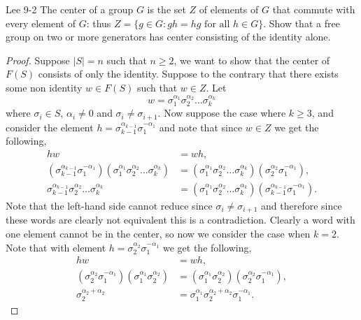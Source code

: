 \documentclass{homework651}
\begin{document}
\begin{problems}

    \problem Lee 9-2 
    The center of a group $G$ is the set $Z$ of elements of $G$ that commute with every element of $G$: thus $Z = \{g \in G: gh = hg \text{ for all } h \in G\}$. Show that a free group on two or more generators has center consisting of the identity alone.
    \begin{proof} Suppose $|S| = n$ such that $n \geq 2$, we want to show that the center of $F(S)$ consists of only the identity. 
        Suppose to the contrary that there exists some non identity $w \in F(S)$ such that $w \in Z$. Let $$w = \sigma^{\alpha_1}_1\sigma^{\alpha_2}_2\dots\sigma^{\alpha_k}_k$$
        where $\sigma_i \in S$, $\alpha_i \neq 0$ and $\sigma_i \neq \sigma_{i + 1}$. Now suppose the case where $k \geq 3$, and consider the element $h = \sigma_{k - 1}^{\alpha_{k - 1}} \sigma_1^{-\alpha_1}$ and note that since $w \in Z$ we get the following, 
        \begin{align*}
            hw &= wh,\\
            (\sigma_{k - 1}^{\alpha_{k - 1}}\sigma_1^{-\alpha_1})(\sigma^{\alpha_1}_1\sigma^{\alpha_2}_2\dots\sigma^{\alpha_k}_k)&= (\sigma^{\alpha_1}_1\sigma^{\alpha_2}_2\dots\sigma^{\alpha_k}_k)(\sigma_2^{\alpha_2}\sigma_1^{-\alpha_1}),\\
            \sigma_{k - 1}^{\alpha_{k - 1}}\sigma^{\alpha_2}_2\dots\sigma^{\alpha_k}_k&= (\sigma^{\alpha_1}_1\sigma^{\alpha_2}_2\dots\sigma^{\alpha_k}_k) (\sigma_{k - 1}^{\alpha_{k - 1}}\sigma_1^{-\alpha_1}).
        \end{align*}
        Note that the left-hand side cannot reduce since $\sigma_i \neq \sigma_{i + 1}$ and therefore since these words are clearly not equivalent this is a contradiction.
        Clearly a word with one element cannot be in the center, so now we consider the case when $k = 2$. Note that with element $h = \sigma^{\alpha_2}_2\sigma_1^{-\alpha_1}$ we get the following, 
        \begin{align*}
            hw &= wh,\\
            (\sigma^{\alpha_2}_2\sigma_1^{-\alpha_1})(\sigma^{\alpha_1}_1\sigma^{\alpha_2}_2) &= (\sigma^{\alpha_1}_1\sigma^{\alpha_2}_2)(\sigma^{\alpha_2}_2\sigma_1^{-\alpha_1}),\\
            \sigma^{\alpha_2+\alpha_2}_2 &= \sigma^{\alpha_1}_1\sigma^{\alpha_2 + \alpha_2}_2\sigma_1^{-\alpha_1}.
        \end{align*}
    \end{proof}











\end{problems}
\end{document}
